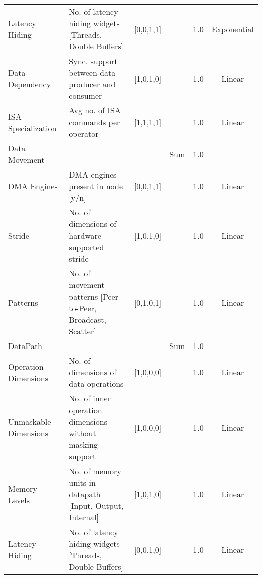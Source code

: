 \begin{tabularx}{\textwidth}{@{}lXcccc@{}}
\hspace{9mm} Latency Hiding & No. of latency hiding widgets [Threads, Double Buffers] & [0,0,1,1] &  & 1.0 & Exponential \\ 

\hspace{9mm} Data Dependency & Sync. support between data producer and consumer & [1,0,1,0] &  & 1.0 & Linear \\ 

\hspace{9mm} ISA Specialization & Avg no. of ISA commands per operator & [1,1,1,1] &  & 1.0 & Linear \\ 

\hspace{6mm} Data Movement &  &  & Sum & 1.0 &  \\ 

\hspace{9mm} DMA Engines & DMA engines present in node [y/n]  & [0,0,1,1] &  & 1.0 & Linear \\ 

\hspace{9mm} Stride & No. of dimensions of hardware supported stride & [1,0,1,0] &  & 1.0 & Linear \\ 

\hspace{9mm} Patterns & No. of movement patterns [Peer-to-Peer, Broadcast, Scatter] & [0,1,0,1] &  & 1.0 & Linear \\ 

\hspace{6mm} DataPath &  &  & Sum & 1.0 &  \\ 

\hspace{9mm} Operation Dimensions & No. of dimensions of data operations & [1,0,0,0] &  & 1.0 & Linear \\ 

\hspace{9mm} Unmaskable Dimensions & No. of inner operation dimensions without masking support & [1,0,0,0] &  & 1.0 & Linear \\ 

\hspace{9mm} Memory Levels & No. of memory units in datapath [Input, Output, Internal] & [1,0,1,0] &  & 1.0 & Linear \\ 

\hspace{9mm} Latency Hiding & No. of latency hiding widgets [Threads, Double Buffers] & [0,0,1,0] &  & 1.0 & Linear \\ 


\end{tabularx}
